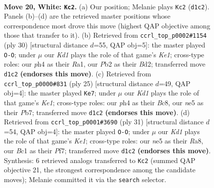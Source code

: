 \documentclass[11pt]{article}
\begin{document}
\clearpage

\begin{figure}[p]\centering
\begin{subfigure}{0.46\textwidth}\centering
\resizebox{\linewidth}{!}{%
\newchessgame
\chessboard[
  setfen={r1b1kb1r/5p2/4p3/pp2n1P1/3p3p/8/PP4PP/R1BK1NNR w kq - 0 20},
  showmover=false,
  pgfstyle=straightmove, color=movearrow, markmove={d1-c2}
]}
\caption{}
\end{subfigure}\hfill
\begin{subfigure}{0.46\textwidth}\centering
\resizebox{\linewidth}{!}{%
\newchessgame
\chessboard[
  setfen={r3kb1r/1p3ppp/p7/3nPp2/2N5/8/PP1B1PPP/R3K2R w KQkq - 0 16},
  showmover=false,
  pgfstyle=straightmove, color=movearrow, markmove={e1-g1}
]}
\caption{}
\end{subfigure}
\\[4pt]
\begin{subfigure}{0.46\textwidth}\centering
\resizebox{\linewidth}{!}{%
\newchessgame
\chessboard[
  setfen={r1b1k2r/pp1n1ppp/4p3/3pP3/3N1P2/8/PPP3PP/R3KB1R b KQkq - 0 13},
  showmover=false,
  pgfstyle=straightmove, color=movearrow, markmove={e8-e7}
]}
\caption{}
\end{subfigure}\hfill
\begin{subfigure}{0.46\textwidth}\centering
\resizebox{\linewidth}{!}{%
\newchessgame
\chessboard[
  setfen={r3k2r/5ppp/p1n1pb2/1p6/8/P1P2P1P/1P3P2/R1B1KB1R b KQkq - 0 16},
  showmover=false,
  pgfstyle=straightmove, color=movearrow, markmove={e8-g8}
]}
\caption{}
\end{subfigure}
\caption{\textbf{Move 20, White: \texttt{Kc2}.} (a) Our position; Melanie plays \texttt{Kc2} (\texttt{d1c2}). Panels (b)--(d) are the retrieved master positions whose correspondence most drove this move (highest QAP objective among those that transfer to it). (b) Retrieved from \texttt{ccrl\_top\_p0002\#1154} (ply 30) [structural distance $d$=55, QAP obj=5]: the master played \texttt{O-O}; under $\mu$ our \emph{Kd1} plays the role of that game's \emph{Ke1}; cross-type roles: our \emph{p}h4 as their \emph{R}a1, our \emph{P}b2 as their \emph{B}d2; transferred move \texttt{d1c2} \textbf{(endorses this move)}. (c) Retrieved from \texttt{ccrl\_top\_p0000\#831} (ply 25) [structural distance $d$=49, QAP obj=4]: the master played \texttt{Ke7}; under $\mu$ our \emph{Kd1} plays the role of that game's \emph{Ke1}; cross-type roles: our \emph{p}h4 as their \emph{B}c8, our \emph{n}e5 as their \emph{P}b7; transferred move \texttt{d1c2} \textbf{(endorses this move)}. (d) Retrieved from \texttt{ccrl\_top\_p0001\#3690} (ply 31) [structural distance $d$=54, QAP obj=4]: the master played \texttt{O-O}; under $\mu$ our \emph{Kd1} plays the role of that game's \emph{Ke1}; cross-type roles: our \emph{n}e5 as their \emph{R}a8, our \emph{B}c1 as their \emph{P}f7; transferred move \texttt{d1c2} \textbf{(endorses this move)}. Synthesis: 6 retrieved analogs transferred to \texttt{Kc2} (summed QAP objective 21, the strongest correspondence among the candidate moves); Melanie committed it via the \texttt{search} selector.}
\label{fig:thought-m38}
\end{figure}
\end{document}
